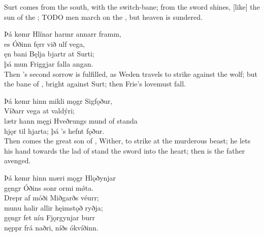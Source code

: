 Surt comes from the south, with the switch-bane\footnotemark[1]; from the sword shines, [like] the sun of the ; TODO men march on the , but heaven is sundered.\footnotemark[2]

\bva Þá kømr Hlínar \hld harmr annarr framm, \\%
es Óðinn fęrr \hld við ulf vega, \\%
ęn bani Bęlja \hld bjartr at Surti; \\%
þá mun Friggjar \hld falla angan.\\%

\bvb Then ’s second sorrow is fulfilled, as Weden travels to strike against the wolf; but the bane of \footnotemark[1], bright against Surt; then Frie’s love\footnotemark[2] must fall.

\bva Þá kømr hinn mikli \hld mǫgr Sigfǫður, \\%
Víðarr vega \hld at valdýri; \\%
lætr hann męgi Hveðrungs \hld mund of standa \\%
hjǫr til hjarta; \hld þá ’s hefnt fǫður.\\%

\bvb Then comes the great son of , Wither, to strike at the murderous beast; he lets his hand towards the lad of \footnotemark[1] stand the sword into the heart; then is the father avenged.

\bva Þá kømr hinn mæri \hld mǫgr Hlǫðynjar \\%
gęngr Óðins sonr \hld ormi mǿta. \\%
Drepr af móði \hld Miðgarðs véurr; \\%
munu halir allir \hld hęimstǫð ryðja; \\%
gęngr fet níu \hld Fjǫrgynjar burr \\%
nęppr frá naðri, \hld níðs ókvíðinn.\footnotemark[1]\\%

